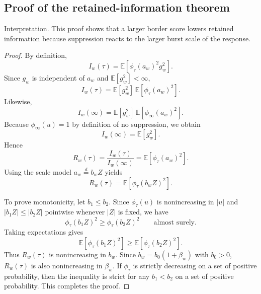 \documentclass[11pt,a4paper]{article}
\begin{document}
\subsection{Proof of the retained-information theorem}\label{app:prooffisher}

Interpretation. This proof shows that a larger border score lowers retained information because suppression reacts to the larger burst scale of the response.

\begin{proof}
By definition,
\begin{equation}
I_w(\tau)
=
\mathbb{E}\!\left[\phi_{\tau}(a_w)^2 g_w^2\right].
\label{eq:appfisherdef}
\end{equation}
Since $g_w$ is independent of $a_w$ and $\mathbb{E}[g_w^2] < \infty$,
\begin{equation}
I_w(\tau)
=
\mathbb{E}[g_w^2]\,
\mathbb{E}\!\left[\phi_{\tau}(a_w)^2\right].
\label{eq:appfactor}
\end{equation}
Likewise,
\begin{equation}
I_w(\infty)
=
\mathbb{E}[g_w^2]\,
\mathbb{E}\!\left[\phi_{\infty}(a_w)^2\right].
\label{eq:appinfty}
\end{equation}
Because $\phi_{\infty}(u)=1$ by definition of no suppression, we obtain
\begin{equation}
I_w(\infty)=\mathbb{E}[g_w^2].
\label{eq:appinfty2}
\end{equation}
Hence
\begin{equation}
R_w(\tau)
=
\frac{I_w(\tau)}{I_w(\infty)}
=
\mathbb{E}\!\left[\phi_{\tau}(a_w)^2\right].
\label{eq:appratio}
\end{equation}
Using the scale model $a_w \overset{d}{=} b_w Z$ yields
\begin{equation}
R_w(\tau)
=
\mathbb{E}\!\left[\phi_{\tau}(b_w Z)^2\right].
\label{eq:appscaled}
\end{equation}

To prove monotonicity, let $b_1 \leq b_2$. Since $\phi_{\tau}(u)$ is nonincreasing in $|u|$ and $|b_1 Z| \leq |b_2 Z|$ pointwise whenever $|Z|$ is fixed, we have
\begin{equation}
\phi_{\tau}(b_1 Z)^2 \geq \phi_{\tau}(b_2 Z)^2
\qquad \text{almost surely.}
\label{eq:appmono}
\end{equation}
Taking expectations gives
\begin{equation}
\mathbb{E}\!\left[\phi_{\tau}(b_1 Z)^2\right]
\geq
\mathbb{E}\!\left[\phi_{\tau}(b_2 Z)^2\right].
\label{eq:appmonoexp}
\end{equation}
Thus $R_w(\tau)$ is nonincreasing in $b_w$. Since $b_w=b_0(1+\beta_w)$ with $b_0>0$, $R_w(\tau)$ is also nonincreasing in $\beta_w$. If $\phi_{\tau}$ is strictly decreasing on a set of positive probability, then the inequality is strict for any $b_1 < b_2$ on a set of positive probability. This completes the proof.
\end{proof}
\end{document}
